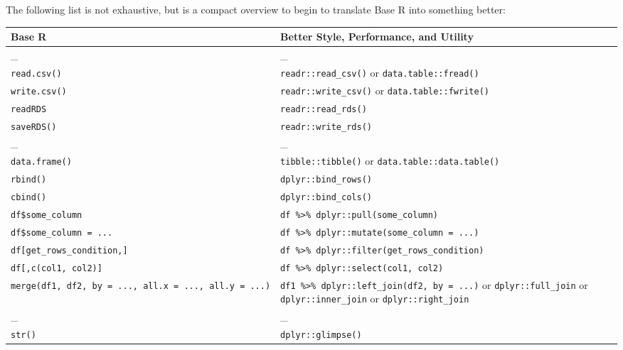 \documentclass[
]{book}
\begin{document}
The following list is not exhaustive, but is a compact overview to begin to translate Base R into something better:

\begin{longtable}[]{@{}
  >{\raggedright\arraybackslash}p{}
  >{\raggedright\arraybackslash}p{}@{}}
\toprule\noalign{}
\begin{minipage}[b]{\linewidth}\raggedright
Base R
\end{minipage} & \begin{minipage}[b]{\linewidth}\raggedright
Better Style, Performance, and Utility
\end{minipage} \\
\midrule\noalign{}
\endhead
\bottomrule\noalign{}
\endlastfoot
\_ & \_ \\
\texttt{read.csv()} & \texttt{readr::read\_csv()} or \texttt{data.table::fread()} \\
\texttt{write.csv()} & \texttt{readr::write\_csv()} or \texttt{data.table::fwrite()} \\
\texttt{readRDS} & \texttt{readr::read\_rds()} \\
\texttt{saveRDS()} & \texttt{readr::write\_rds()} \\
\_ & \_ \\
\texttt{data.frame()} & \texttt{tibble::tibble()} or \texttt{data.table::data.table()} \\
\texttt{rbind()} & \texttt{dplyr::bind\_rows()} \\
\texttt{cbind()} & \texttt{dplyr::bind\_cols()} \\
\texttt{df\$some\_column} & \texttt{df\ \%\textgreater{}\%\ dplyr::pull(some\_column)} \\
\texttt{df\$some\_column\ =\ ...} & \texttt{df\ \%\textgreater{}\%\ dplyr::mutate(some\_column\ =\ ...)} \\
\texttt{df{[}get\_rows\_condition,{]}} & \texttt{df\ \%\textgreater{}\%\ dplyr::filter(get\_rows\_condition)} \\
\texttt{df{[},c(col1,\ col2){]}} & \texttt{df\ \%\textgreater{}\%\ dplyr::select(col1,\ col2)} \\
\texttt{merge(df1,\ df2,\ by\ =\ ...,\ all.x\ =\ ...,\ all.y\ =\ ...)} & \texttt{df1\ \%\textgreater{}\%\ dplyr::left\_join(df2,\ by\ =\ ...)} or \texttt{dplyr::full\_join} or \texttt{dplyr::inner\_join} or \texttt{dplyr::right\_join} \\
\_ & \_ \\
\texttt{str()} & \texttt{dplyr::glimpse()} \\

\end{longtable}
\end{document}
